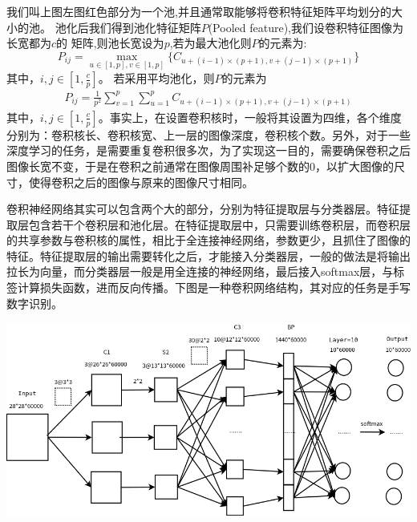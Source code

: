 我们叫上图左图红色部分为一个池,并且通常取能够将卷积特征矩阵平均划分的大小的池。
池化后我们得到池化特征矩阵$P$(Pooled feature),我们设卷积特征图像为长宽都为$c$的
矩阵,则池长宽设为$p$,若为最大池化则$P$的元素为:
\begin{equation}
P_{ij}=\max_{u\in[1,p],v\in[1,p]}\{C_{u+(i-1)\times(p+1),v+(j-1)\times(p+1)}\}
\end{equation}
其中，$i,j\in[1,\frac{c}{p}]$。
若采用平均池化，则$P$的元素为
\begin{eqnarray}
P_{ij}=\frac{1}{p^2}\sum_{v=1}^p\sum_{u=1}^pC_{u+(i-1)\times(p+1),v+(j-1)\times(p+1)}
\end{eqnarray}
其中，$i,j\in[1,\frac{c}{p}]$。事实上，在设置卷积核时，一般将其设置为四维，各个维度分别为：卷积核长、卷积核宽、上一层的图像深度，卷积核个数。另外，对于一些深度学习的任务，是需要重复卷积很多次，为了实现这一目的，需要确保卷积之后图像长宽不变，于是在卷积之前通常在图像周围补足够个数的0，以扩大图像的尺寸，使得卷积之后的图像与原来的图像尺寸相同。

卷积神经网络其实可以包含两个大的部分，分别为特征提取层与分类器层。特征提取层包含若干个卷积层和池化层。在特征提取层中，只需要训练卷积层，而卷积层的共享参数与卷积核的属性，相比于全连接神经网络，参数更少，且抓住了图像的特征。特征提取层的输出需要转化之后，才能接入分类器层，一般的做法是将输出拉长为向量，而分类器层一般是用全连接的神经网络，最后接入softmax层，与标签计算损失函数，进而反向传播。下图是一种卷积网络结构，其对应的任务是手写数字识别。

\begin{center}
\includegraphics[scale=0.4]{../figures/CNN1.png} 
\end{center}

